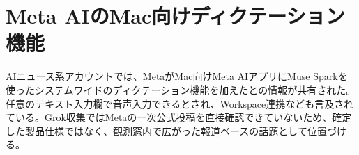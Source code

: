 \section{Meta AIのMac向けディクテーション機能}
AIニュース系アカウントでは、MetaがMac向けMeta AIアプリにMuse Sparkを使ったシステムワイドのディクテーション機能を加えたとの情報が共有された。任意のテキスト入力欄で音声入力できるとされ、Workspace連携なども言及されている。Grok収集ではMetaの一次公式投稿を直接確認できていないため、確定した製品仕様ではなく、観測窓内で広がった報道ベースの話題として位置づける。
